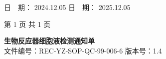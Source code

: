 \documentclass[UTF8,10pt,a4paper,fontset=fandol]{ctexart}
\newcommand{\fieldvalue}[1]{#1}
\newcommand{\handwritten}[1]{#1}
\begin{document}
\vspace{4mm}

\noindent
日　期：
\fieldvalue{\handwritten{2024.12.05}}
\hfill
日　期：
\fieldvalue{\handwritten{2025.12.05}}

\vfill

\begin{center}
第 1 页 共 1 页
\end{center}

\newpage

\begin{center}
{\large \textbf{生物反应器细胞液检测通知单}}\\[2mm]
文件编号：REC-YZ-SOP-QC-99-006-6 \hfill 版本号：1.4
\end{center}
\end{document}
